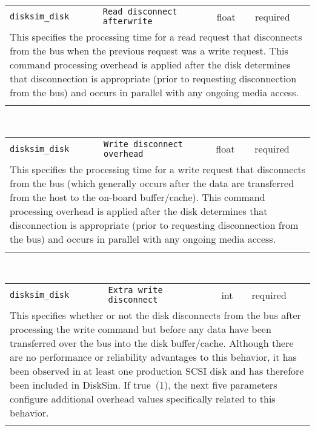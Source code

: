 \noindent 
\begin{tabular}{|p{\lpmodwidth}|p{\lpnamewidth}|p{0.5in}|p{0.5in}|}
\cline{1-4}
\texttt{disksim\_disk} & \texttt{Read disconnect afterwrite} & float & required \\ 
\cline{1-4}
\multicolumn{4}{|p{6in}|}{
This specifies the processing time for a read request that disconnects
from the bus when the previous request was a write request. This
command processing overhead is applied after the disk determines that
disconnection is appropriate (prior to requesting disconnection from
the bus) and occurs in parallel with any ongoing media access.
}\\ 
\cline{1-4}
\multicolumn{4}{p{5in}}{}\\
\end{tabular}\\ 
\noindent 
\begin{tabular}{|p{\lpmodwidth}|p{\lpnamewidth}|p{0.5in}|p{0.5in}|}
\cline{1-4}
\texttt{disksim\_disk} & \texttt{Write disconnect overhead} & float & required \\ 
\cline{1-4}
\multicolumn{4}{|p{6in}|}{
This specifies the processing time for a write request that disconnects
from the bus (which generally occurs after the data are transferred
from the host to the on-board buffer/cache). This command processing
overhead is applied after the disk determines that disconnection is
appropriate (prior to requesting disconnection from the bus) and
occurs in parallel with any ongoing media access.
}\\ 
\cline{1-4}
\multicolumn{4}{p{5in}}{}\\
\end{tabular}\\ 
\noindent 
\begin{tabular}{|p{\lpmodwidth}|p{\lpnamewidth}|p{0.5in}|p{0.5in}|}
\cline{1-4}
\texttt{disksim\_disk} & \texttt{Extra write disconnect} & int & required \\ 
\cline{1-4}
\multicolumn{4}{|p{6in}|}{
This specifies whether or not the disk disconnects from the bus after
processing the write command but before any data have been transferred
over the bus into the disk buffer/cache. Although there are no
performance or reliability advantages to this behavior, it has been
observed in at least one production SCSI disk and has therefore been
included in DiskSim. If true~(1), the next five parameters configure
additional overhead values specifically related to this behavior.
}\\ 
\cline{1-4}
\multicolumn{4}{p{5in}}{}\\
\end{tabular}\\ 
